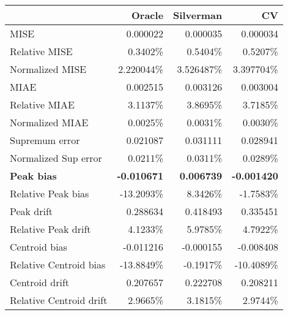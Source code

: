 \begin{tabular}{lrrr}
  \toprule
 & Oracle & Silverman & CV \\ 
  \midrule
MISE & 0.000022 & 0.000035 & 0.000034 \\ 
  Relative MISE & 0.3402\% & 0.5404\% & 0.5207\% \\ 
  Normalized MISE & 2.220044\% & 3.526487\% & 3.397704\% \\ 
  MIAE & 0.002515 & 0.003126 & 0.003004 \\ 
  Relative MIAE & 3.1137\% & 3.8695\% & 3.7185\% \\ 
  Normalized MIAE & 0.0025\% & 0.0031\% & 0.0030\% \\ 
  Supremum error & 0.021087 & 0.031111 & 0.028941 \\ 
  Normalized Sup error & 0.0211\% & 0.0311\% & 0.0289\% \\ 
  \textbf{Peak bias} & \textbf{-0.010671} & \textbf{0.006739} & \textbf{-0.001420} \\ 
  Relative Peak bias & -13.2093\% & 8.3426\% & -1.7583\% \\ 
  Peak drift & 0.288634 & 0.418493 & 0.335451 \\ 
  Relative Peak drift & 4.1233\% & 5.9785\% & 4.7922\% \\ 
  Centroid bias & -0.011216 & -0.000155 & -0.008408 \\ 
  Relative Centroid bias & -13.8849\% & -0.1917\% & -10.4089\% \\ 
  Centroid drift & 0.207657 & 0.222708 & 0.208211 \\ 
  Relative Centroid drift & 2.9665\% & 3.1815\% & 2.9744\% \\ 
   \bottomrule
\end{tabular}
